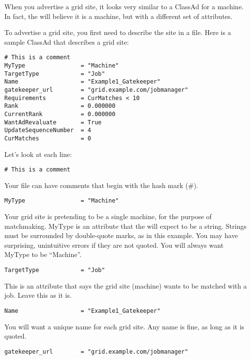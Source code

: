 When you advertise a grid site, it looks very similar to a ClassAd for
a machine. In fact, the  will believe it is a
machine, but with a different set of attributes. 

To advertise a grid site, you first need to describe the site in a
file. Here is a sample ClassAd that describes a grid site:

\begin{verbatim}
# This is a comment
MyType                = "Machine"
TargetType            = "Job"
Name                  = "Example1_Gatekeeper"
gatekeeper_url        = "grid.example.com/jobmanager"
Requirements          = CurMatches < 10
Rank                  = 0.000000
CurrentRank           = 0.000000
WantAdRevaluate       = True
UpdateSequenceNumber  = 4
CurMatches            = 0
\end{verbatim}

Let's look at each line:

\begin{verbatim}
# This is a comment
\end{verbatim}

Your file can have comments that begin with the hash mark (\#). 

\begin{verbatim}
MyType                = "Machine"
\end{verbatim}

Your grid site is pretending to be a single machine, for the purpose
of matchmaking. MyType is an attribute that the 
will expect to be a string. Strings must be surrounded by double-quote
marks, as in this example. You may have surprising, unintuitive errors
if they are not quoted. You will always want MyType to be
``Machine''. 

\begin{verbatim}
TargetType            = "Job"
\end{verbatim}

This is an attribute that says the grid site (machine) wants to be
matched with a job. Leave this as it is. 


\begin{verbatim}
Name                  = "Example1_Gatekeeper"
\end{verbatim}

You will want a unique name for each grid site. Any name is fine, as long as
it is quoted.

\begin{verbatim}
gatekeeper_url        = "grid.example.com/jobmanager"
\end{verbatim}

